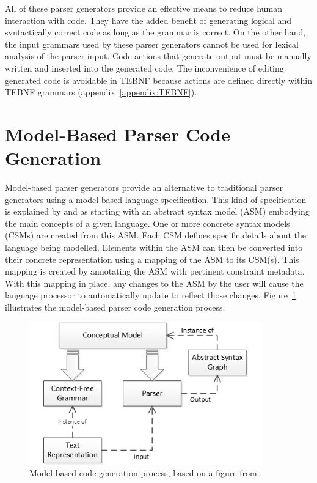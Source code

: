 \indent
All of these parser generators provide an effective means to reduce human interaction with code.  They have the added benefit of generating logical and syntactically correct code as long as the grammar is correct.  On the other hand, the input grammars used by these parser generators cannot be used for lexical analysis of the parser input.  Code actions that generate output must be manually written and inserted into the generated code.  The inconvenience of editing generated code is avoidable in TEBNF because actions are defined directly within TEBNF grammars (appendix~\ref{appendix:TEBNF}).

\section{Model-Based Parser Code Generation}

\indent
Model-based parser generators provide an alternative to traditional parser generators using a model-based language specification.  This kind of specification is explained by \cite{quesada_01} and \cite{quesada_02} as starting with an abstract syntax model (ASM) embodying the main concepts of a given language.  One or more concrete syntax models (CSMs) are created from this ASM.  Each CSM defines specific details about the language being modelled.  Elements within the ASM can then be converted into their concrete representation using a mapping of the ASM to its CSM(s).  This mapping is created by annotating the ASM with pertinent constraint metadata.  With this mapping in place, any changes to the ASM by the user will cause the language processor to automatically update to reflect those changes.  Figure~\ref{fig:ModelBasedCodeGenProcess} illustrates the model-based parser code generation process.

\begin{figure}[h!]
\centering
\includegraphics[width=0.9\textwidth]{figures/ModelBasedCodeGenProcess.png}
\caption[Model-based code generation process.]{Model-based code generation process, based on a figure from \cite{quesada_02}.}
\label{fig:ModelBasedCodeGenProcess}
\end{figure}

